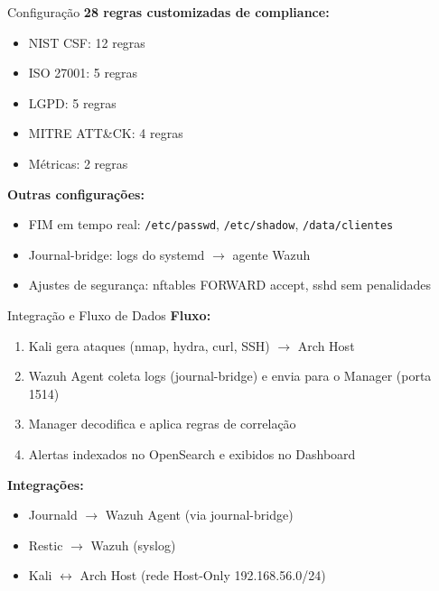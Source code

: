 \documentclass[aspectratio=169,12pt]{beamer}
\begin{document}
\begin{frame}{Configuração}
\vspace{0.3cm}
\textbf{28 regras customizadas de compliance:}
\begin{itemize}
    \item NIST CSF: 12 regras
    \item ISO 27001: 5 regras
    \item LGPD: 5 regras
    \item MITRE ATT\&CK: 4 regras
    \item Métricas: 2 regras
\end{itemize}

\vspace{0.3cm}
\textbf{Outras configurações:}
\begin{itemize}
    \item FIM em tempo real: \texttt{/etc/passwd}, \texttt{/etc/shadow}, \texttt{/data/clientes}
    \item Journal-bridge: logs do systemd $\rightarrow$ agente Wazuh
    \item Ajustes de segurança: nftables FORWARD accept, sshd sem penalidades
\end{itemize}
\end{frame}

\begin{frame}{Integração e Fluxo de Dados}
\centering
\vspace{0.3cm}
\textbf{Fluxo:}
\begin{enumerate}
    \item Kali gera ataques (nmap, hydra, curl, SSH) $\rightarrow$ Arch Host
    \item Wazuh Agent coleta logs (journal-bridge) e envia para o Manager (porta 1514)
    \item Manager decodifica e aplica regras de correlação
    \item Alertas indexados no OpenSearch e exibidos no Dashboard
\end{enumerate}

\vspace{0.3cm}
\textbf{Integrações:}
\begin{itemize}
    \item Journald $\rightarrow$ Wazuh Agent (via journal-bridge)
    \item Restic $\rightarrow$ Wazuh (syslog)
    \item Kali $\leftrightarrow$ Arch Host (rede Host-Only 192.168.56.0/24)
\end{itemize}
\end{frame}
\end{document}
